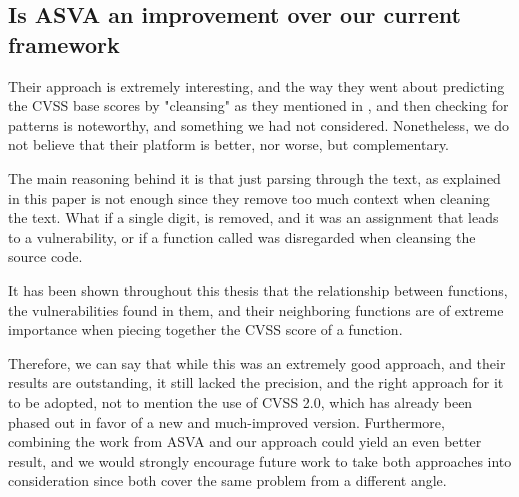 \subsection{Is ASVA an improvement over our current framework}

Their approach is extremely interesting, and the way they went about predicting the CVSS base scores by "cleansing" as they mentioned in \parencite{novelty}, and then checking for patterns is noteworthy, and something we had not considered. Nonetheless, we do not believe that their platform is better, nor worse, but complementary.

The main reasoning behind it is that just parsing through the text, as explained in this paper is not enough since they remove too much context when cleaning the text. What if a single digit, is removed, and it was an assignment that leads to a vulnerability, or if a function called was disregarded when cleansing the source code.

It has been shown throughout this thesis that the relationship between functions, the vulnerabilities found in them, and their neighboring functions are of extreme importance when piecing together the CVSS score of a function.

Therefore, we can say that while this was an extremely good approach, and their results are outstanding, it still lacked the precision, and the right approach for it to be adopted, not to mention the use of CVSS 2.0, which has already been phased out in favor of a new and much-improved version. Furthermore, combining the work from ASVA and our approach could yield an even better result, and we would strongly encourage future work to take both approaches into consideration since both cover the same problem from a different angle.


